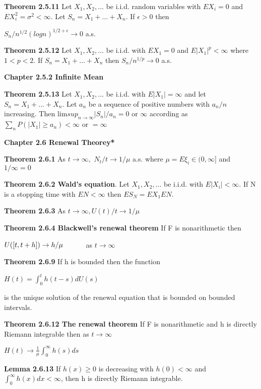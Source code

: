 \documentclass{article}
\newcommand\tab[1][1cm]{\hspace*{#1}}
\begin{document}
\textbf {Theorem 2.5.11} Let $X_1 , X_2 ,...$ be i.i.d. random variables with $EX_i = 0$ and $EX_i^2 = \sigma^2 < \infty$. Let $S_n = X_1 + \dots + X_n$. If $\epsilon > 0$ then
\begin{center}
$S_n / n^{1/2} (log n)^{1/2+\epsilon} \rightarrow 0$ a.s.
\end{center}

\textbf {Theorem 2.5.12} Let $X_1 , X_2 ,...$ be i.i.d. with $EX_1 = 0$ and $E|X_1|^p < \infty $ where $1 < p < 2$. If $S_n = X_1 + \dots + X_n$ then $S_n /n^{1/p} \rightarrow 0$ a.s.

\textbf {Chapter 2.5.2 Infinite Mean}

\textbf {Theorem 2.5.13} Let $X_1 , X_2 ,...$ be i.i.d. with $E|X_1| = \infty$ and let $S_n = X_1 + \dots + X_n$. Let $a_n$ be a sequence of positive numbers with $a_n / n$ increasing. Then lim$sup_{n \to \infty} |S_n| / a_n = 0$ or $\infty$ according as $\sum_n P(|X_1| \geq a_n) < \infty$ or $= \infty$

\textbf {Chapter 2.6 Renewal Theorey*}

\textbf {Theorem 2.6.1} As $t \rightarrow \infty,$ $N_t / t \rightarrow 1/\mu$ a.s. where $\mu = E\xi_i \in (0,\infty]$ and $1/\infty = 0$

\textbf {Theorem 2.6.2 Wald's equation}. Let $X_1 , X_2 ,...$ be i.i.d. with $E|X_i| < \infty.$ If N is a stopping time with $EN < \infty$ then $ES_N = EX_1 EN.$

\textbf {Theorem 2.6.3} As $t \rightarrow \infty, U(t)/t \rightarrow 1/\mu$

\textbf {Theorem 2.6.4 Blackwell's renewal theorem} If F is nonarithmetic then
\begin{center}
$U([t,t + h]) \rightarrow h/\mu \tab$ as $t \rightarrow \infty$
\end{center}

\textbf {Theorem 2.6.9} If h is bounded then the function
\begin{center}
$H(t) = \int_{0}^{t} h(t-s) dU(s)$
\end{center}
is the unique solution of the renewal equation that is bounded on bounded intervals.

\textbf {Theorem 2.6.12 The renewal theorem} If F is nonarithmetic and h is directly Riemann integrable then as $t \rightarrow \infty$
\begin{center}
$H(t) \rightarrow \frac{1}{\mu} \int_{0}^{\infty} h(s) ds$
\end{center}

\textbf {Lemma 2.6.13} If $h(x) \geq 0$ is decreasing with $h(0) < \infty$ and $\int_{0}^{\infty} h(x) dx < \infty$, then h is directly Riemann integrable. 
\end{document}

